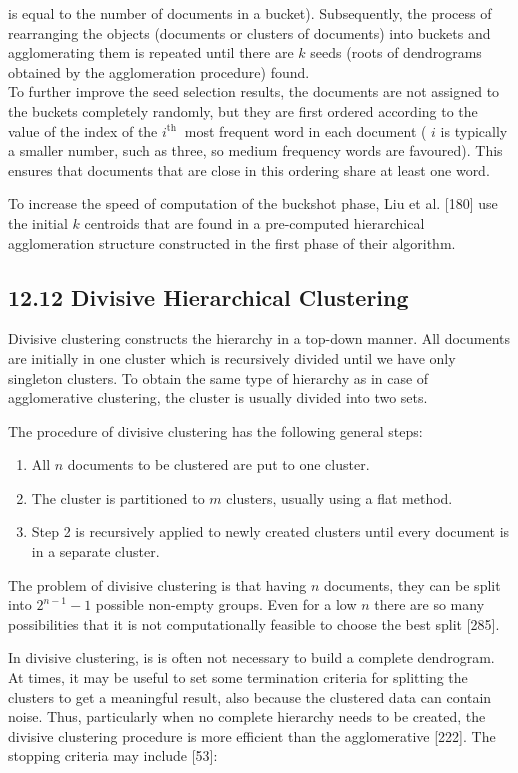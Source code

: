 \documentclass[10pt]{book}
\begin{document}
is equal to the number of documents in a bucket). Subsequently, the process of rearranging the objects (documents or clusters of documents) into buckets and agglomerating them is repeated until there are $k$ seeds (roots of dendrograms obtained by the agglomeration procedure) found.\\
To further improve the seed selection results, the documents are not assigned to the buckets completely randomly, but they are first ordered according to the value of the index of the $i^{\text {th }}$ most frequent word in each document ( $i$ is typically a smaller number, such as three, so medium frequency words are favoured). This ensures that documents that are close in this ordering share at least one word.

To increase the speed of computation of the buckshot phase, Liu et al. [180] use the initial $k$ centroids that are found in a pre-computed hierarchical agglomeration structure constructed in the first phase of their algorithm.

\subsection*{12.12 Divisive Hierarchical Clustering}
Divisive clustering constructs the hierarchy in a top-down manner. All documents are initially in one cluster which is recursively divided until we have only singleton clusters. To obtain the same type of hierarchy as in case of agglomerative clustering, the cluster is usually divided into two sets.

The procedure of divisive clustering has the following general steps:

\begin{enumerate}
  \item All $n$ documents to be clustered are put to one cluster.
  \item The cluster is partitioned to $m$ clusters, usually using a flat method.
  \item Step 2 is recursively applied to newly created clusters until every document is in a separate cluster.
\end{enumerate}

The problem of divisive clustering is that having $n$ documents, they can be split into $2^{n-1}-1$ possible non-empty groups. Even for a low $n$ there are so many possibilities that it is not computationally feasible to choose the best split [285].

In divisive clustering, is is often not necessary to build a complete dendrogram. At times, it may be useful to set some termination criteria for splitting the clusters to get a meaningful result, also because the clustered data can contain noise. Thus, particularly when no complete hierarchy needs to be created, the divisive clustering procedure is more efficient than the agglomerative [222]. The stopping criteria may include [53]:
\end{document}
